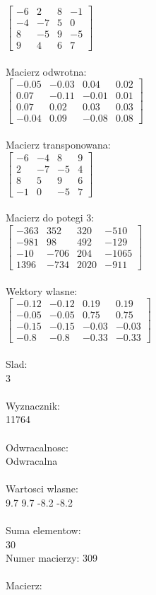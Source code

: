 \documentclass[a4paper,12pt]{article}
\begin{document}
$\begin{bmatrix} -6&2&8&-1\\-4&-7&5&0\\8&-5&9&-5\\9&4&6&7 \end{bmatrix}$
\\
\\
Macierz odwrotna:\\

$\begin{bmatrix} -0.05&-0.03&0.04&0.02\\0.07&-0.11&-0.01&0.01\\0.07&0.02&0.03&0.03\\-0.04&0.09&-0.08&0.08 \end{bmatrix}$
\\
\\
Macierz transponowana:\\

$\begin{bmatrix} -6&-4&8&9\\2&-7&-5&4\\8&5&9&6\\-1&0&-5&7 \end{bmatrix}$
\\
\\
Macierz do potegi 3:\\

$\begin{bmatrix} -363&352&320&-510\\-981&98&492&-129\\-10&-706&204&-1065\\1396&-734&2020&-911 \end{bmatrix}$
\\
\\
Wektory wlasne:\\

$\begin{bmatrix} -0.12&-0.12&0.19&0.19\\-0.05&-0.05&0.75&0.75\\-0.15&-0.15&-0.03&-0.03\\-0.8&-0.8&-0.33&-0.33 \end{bmatrix}$
\\
\\
Slad:\\
3
\\
\\
Wyznacznik:\\
11764
\\
\\
Odwracalnosc:\\
Odwracalna
\\
\\
Wartosci wlasne:\\
9.7 9.7 -8.2 -8.2
\\
\\
Suma elementow:\\
30
\\
\newpage
Numer macierzy:
309
\\
\\
Macierz:\\
\end{document}
